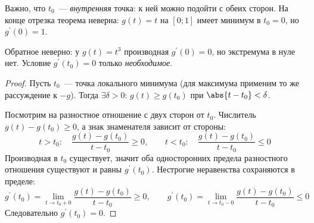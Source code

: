 

\begin{remark}
  Важно, что $t_0$~--- \emph{внутренняя} точка: к ней можно подойти с обеих сторон. На конце отрезка теорема неверна: $g(t) = t$ на $[0;1]$ имеет минимум в $t_0 = 0$, но $g^{\prime}(0) = 1$.
\end{remark}

\begin{remark}
  Обратное неверно: у $g(t) = t^3$ производная $g^{\prime}(0) = 0$, но экстремума в нуле нет. Условие $g^{\prime}(t_0) = 0$ только \emph{необходимое}.
\end{remark}

\begin{proof}
  Пусть $t_0$~--- точка локального минимума (для максимума применим то же рассуждение к $-g$).
  Тогда $\exists \delta > 0$: $g(t) \ge g(t_0)$ при $\abs{t - t_0} < \delta$.

  Посмотрим на разностное отношение с двух сторон от $t_0$. Числитель $g(t) - g(t_0) \ge 0$, а знак знаменателя зависит от стороны:
  \[
  t > t_0:\quad \frac{g(t) - g(t_0)}{t - t_0} \ge 0, \qquad t < t_0:\quad \frac{g(t) - g(t_0)}{t - t_0} \le 0
  \]
  Производная в $t_0$ существует, значит оба односторонних предела разностного отношения существуют и равны $g^{\prime}(t_0)$. Нестрогие неравенства сохраняются в пределе:
  \[
  g^{\prime}(t_0) = \lim_{t \rightarrow t_0 + 0} \frac{g(t) - g(t_0)}{t - t_0} \ge 0, \qquad
  g^{\prime}(t_0) = \lim_{t \rightarrow t_0 - 0} \frac{g(t) - g(t_0)}{t - t_0} \le 0
  \]
  Следовательно $g^{\prime}(t_0) = 0$.
\end{proof}
